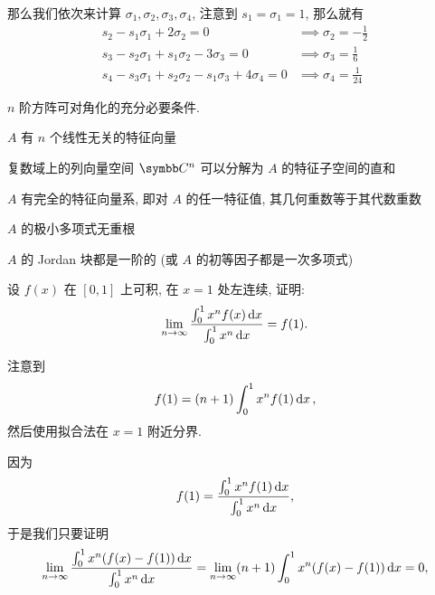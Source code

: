 \begin{exercise}[series=exer]
\begin{answer}
      那么我们依次来计算 $ \sigma_{1}, \sigma_{2}, \sigma_{3}, \sigma_{4} $, 注意到 $ s_{1} = \sigma_{1} = 1 $, 那么就有
      \begin{align*}
          s_{2} - s_{1}\sigma_{1} + 2\sigma_{2} = 0 & \implies \sigma_{2} = -\frac{1}{2}\\
          s_{3} - s_{2}\sigma_{1} + s_{1}\sigma_{2} - 3\sigma_{3} = 0 & \implies \sigma_{3} = \frac{1}{6}\\
          s_{4} - s_{3}\sigma_{1} + s_{2}\sigma_{2} - s_{1}\sigma_{3} + 4\sigma_{4} = 0 & \implies \sigma_{4} = \frac{1}{24}
      \end{align*}
  \end{answer}
  \item $ n $ 阶方阵可对角化的充分必要条件.
  \begin{hint}
      \begin{hintsheet}
          \item $ A $ 有 $ n $ 个线性无关的特征向量
          \item 复数域上的列向量空间 $ \C^{n} $ 可以分解为 $ A $ 的特征子空间的直和
          \item $ A $ 有完全的特征向量系, 即对 $ A $ 的任一特征值, 其几何重数等于其代数重数
          \item $ A $ 的极小多项式无重根
          \item $ A $ 的 Jordan 块都是一阶的 (或 $ A $ 的初等因子都是一次多项式)
      \end{hintsheet}
  \end{hint}
  \hitem 设 $ f(x) $ 在 $ [0, 1] $ 上可积, 在 $ x = 1 $ 处左连续, 证明:
  \begin{align*}
      \limit{n}{\infty}\frac{\int_{0}^{1} x^{n} f(x) \dx*}{\int_{0}^{1} x^{n} \dx*} = f(1).
  \end{align*}
  \begin{hint}
      注意到
      \begin{align*}
          f(1) = (n + 1) \int_{0}^{1} x^{n} f(1) \dx*,
      \end{align*}
      然后使用拟合法在 $  x = 1 $ 附近分界.
  \end{hint}
  \begin{answer}
      因为
      \begin{align*}
          f(1) = \frac{\int_{0}^{1} x^{n} f(1) \dx*}{\int_{0}^{1} x^{n} \dx*},
      \end{align*}
      于是我们只要证明
      \begin{align*}
          \limit{n}{\infty} \frac{\int_{0}^{1} x^{n} (f(x) - f(1)) \dx*}{\int_{0}^{1} x^{n} \dx*} = \limit{n}{\infty} (n + 1) \int_{0}^{1} x^{n} (f(x) - f(1)) \dx* = 0,

\end{align*}
\end{answer}
\end{exercise}

